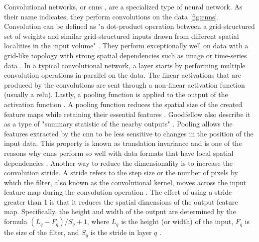 Convolutional networks, or \glspl{cnn} \cite{lecun1998GradientbasedLearningApplied}, are a specialized type of neural network.
As their name indicates, they perform convolutions on the data \autoref{fig:cnns}.
Convolution can be defined as "a dot-product operation between a grid-structured set of weights and similar grid-structured inputs drawn from
different spatial localities in the input volume" \cite[p. 316]{aggarwal2018NeuralNetworksDeep}.
They perform exceptionally well on data with a grid-like topology with strong spatial dependencies such as image or time-series data \cite{aggarwal2018NeuralNetworksDeep, Goodfellow-et-al-2016}.
In a typical convolutional network, a layer starts by performing multiple convolution operations in parallel on the data.
The linear activations that are produced by the convolutions are sent through a non-linear activation function (usually a \gls{relu}).
Lastly, a pooling function is applied to the output of the activation function \cite{aggarwal2018NeuralNetworksDeep}.
A pooling function reduces the spatial size of the created feature maps while retaining their essential features \cite{Goodfellow-et-al-2016, aggarwal2018NeuralNetworksDeep}.
Goodfellow \etal also describe it as a type of "summary statistic of the nearby outputs" \cite[p. 335]{Goodfellow-et-al-2016}.
Pooling allows the features extracted by the \gls{cnn} to be less sensitive to changes in the position of the input data.
This property is known as translation invariance and is one of the reasons why \glspl{cnn} perform so well with data formats that have local spatial dependencies \cite{Goodfellow-et-al-2016, aggarwal2018NeuralNetworksDeep}.
Another way to reduce the dimensionality is to increase the convolution stride.
A stride refers to the step size or the number of pixels by which the filter, also known as the convolutional kernel, moves across the input feature map during the convolution operation \cite{aggarwal2018NeuralNetworksDeep}.
The effect of using a stride greater than 1 is that it reduces the spatial dimensions of the output feature map. 
Specifically, the height and width of the output are determined by the formula $(L_q - F_q)/S_q + 1$, where $L_q$ is the height (or width) of the input, $F_q$ is the size of the filter, and $S_q$ is the stride in layer $q$ \cite[p. 324]{aggarwal2018NeuralNetworksDeep}.

